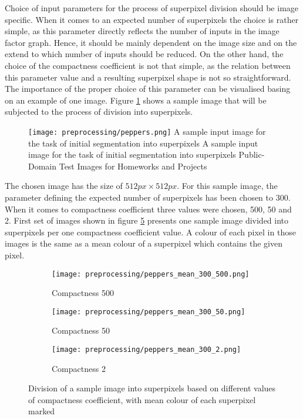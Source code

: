 Choice of input parameters for the process of superpixel division should be image specific. When it comes to an expected number of superpixels the choice is rather simple, as this parameter directly reflects the number of inputs in the image factor graph. Hence, it should be mainly dependent on the image size and on the extend to which number of inputs should be reduced. On the other hand, the choice of the compactness coefficient is not that simple, as the relation between this parameter value and a resulting superpixel shape is not so straightforward. The importance of the proper choice of this parameter can be visualised basing on an example of one image. Figure \ref{fig:peppers} shows a sample image that will be subjected to the process of division into superpixels.
\begin{figure}[ht]
    \centering
    \texttt{[image: preprocessing/peppers.png]}
    \captionsource
    {A sample input image for the task of initial segmentation into superpixels}
    {A sample input image for the task of initial segmentation into superpixels}
    {Public-Domain Test Images for Homeworks and Projects \cite{peppers}}
     \label{fig:peppers}
\end{figure}
The chosen image has the size of $512px \times 512px$. For this sample image, the parameter defining the expected number of superpixels has been chosen to $300$. When it comes to compactness coefficient three values were chosen, 500, 50 and 2. First set of images shown in figure \ref{fig:peppers_mean_colour} presents one sample image divided into superpixels per one compactness coefficient value. A colour of each pixel in those images is the same as a mean colour of a superpixel which contains the given pixel.  
\begin{figure}[ht]
 \centering
  \begin{subfigure}[h]{0.32\textwidth}
    \texttt{[image: preprocessing/peppers\_mean\_300\_500.png]}
    \caption{Compactness 500}
    \label{fig:peppers_mean_colour_500}
  \end{subfigure}
  \begin{subfigure}[h]{0.32\textwidth}
    \texttt{[image: preprocessing/peppers\_mean\_300\_50.png]}
    \caption{Compactness 50}
    \label{fig:peppers_mean_colour_50}
  \end{subfigure}
    \begin{subfigure}[h]{0.32\textwidth}
    \texttt{[image: preprocessing/peppers\_mean\_300\_2.png]}
    \caption{Compactness 2}
    \label{fig:peppers_mean_colour_2}
  \end{subfigure}
    \caption{Division of a sample image into superpixels based on different values of compactness coefficient, with mean colour of each superpixel marked}%
    \label{fig:peppers_mean_colour}
\end{figure}
